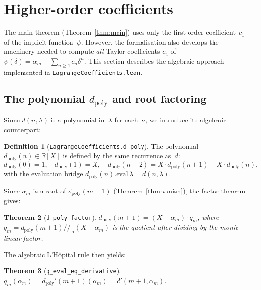 \documentclass[11pt,a4paper]{article}
\theoremstyle{plain}
\newtheorem{theorem}{Theorem}[section]
\theoremstyle{definition}
\newtheorem{definition}[theorem]{Definition}
\newcommand{\R}{\mathbb{R}}
\newcommand{\alpham}{\alpha_m}
\newcommand{\lean}[1]{\texttt{#1}}
\begin{document}
\section{Higher-order coefficients}
\label{sec:higher-order}

The main theorem (Theorem~\ref{thm:main}) uses only the first-order
coefficient~$c_1$ of the implicit function~$\psi$.  However, the
formalisation also develops the machinery needed to compute
\emph{all} Taylor coefficients $c_n$ of~$\psi(\delta) = \alpham +
\sum_{n \ge 1} c_n \delta^n$.  This section describes the algebraic
approach implemented in \lean{LagrangeCoefficients.lean}.

\subsection{The polynomial \texorpdfstring{$d_{\mathrm{poly}}$}{d\_poly} and root factoring}

Since $d(n, \lambda)$ is a polynomial in~$\lambda$ for each~$n$,
we introduce its algebraic counterpart:

\begin{definition}[\lean{LagrangeCoefficients.d\_poly}]
The polynomial $d_{\mathrm{poly}}(n) \in \R[X]$ is defined by the
same recurrence as~$d$:
\[
  d_{\mathrm{poly}}(0) = 1, \quad
  d_{\mathrm{poly}}(1) = X, \quad
  d_{\mathrm{poly}}(n{+}2) = X \cdot d_{\mathrm{poly}}(n{+}1) - X \cdot d_{\mathrm{poly}}(n),
\]
with the evaluation bridge
$d_{\mathrm{poly}}(n).\mathrm{eval}\,\lambda = d(n, \lambda)$.
\end{definition}

Since $\alpham$ is a root of $d_{\mathrm{poly}}(m{+}1)$
(Theorem~\ref{thm:vanish}), the factor theorem gives:

\begin{theorem}[\lean{d\_poly\_factor}]
\label{thm:d-poly-factor}
$d_{\mathrm{poly}}(m{+}1) = (X - \alpham) \cdot q_m$, where
$q_m = d_{\mathrm{poly}}(m{+}1) \mathbin{/\!\!/_{\mathrm{m}}} (X - \alpham)$
is the quotient after dividing by the monic linear factor.
\end{theorem}

The algebraic L'H\^opital rule then yields:

\begin{theorem}[\lean{q\_eval\_eq\_derivative}]
\label{thm:q-eval}
$q_m(\alpham) = d_{\mathrm{poly}}'(m{+}1)(\alpham) = d'(m{+}1,\alpham)$.
\end{theorem}
\end{document}

